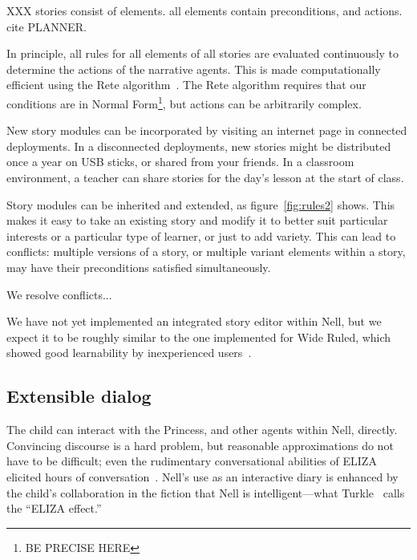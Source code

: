 \documentclass{acm_proc_article-sp}
\begin{document}
XXX stories consist of elements.  all elements contain preconditions,
and actions.  cite PLANNER.

In principle, all rules for all elements of all stories are evaluated
continuously to determine the actions of the narrative agents.  This
is made computationally efficient using the Rete
algorithm~\cite{rete}.  The Rete algorithm requires that our
conditions are in Normal Form\footnote{BE PRECISE HERE}, but actions
can be arbitrarily complex.

New story modules can be incorporated by visiting an internet page in
connected deployments.  In a disconnected deployments, new stories
might be distributed once a year on USB sticks, or shared from your
friends.  In a classroom environment, a teacher can share stories for
the day's lesson at the start of class.

Story modules can be inherited and extended, as figure~\ref{fig:rules2}
shows.  This makes it easy to take an existing story and modify it to
better suit particular interests or a particular type of learner, or
just to add variety.  This can lead to conflicts: multiple versions of
a story, or multiple variant elements within a story, may have their
preconditions satisfied simultaneously.

We resolve conflicts...

We have not yet implemented an integrated story editor within Nell,
but we expect it to be roughly similar to the one implemented for
Wide Ruled, which showed good learnability by inexperienced
users~\cite{wideruled}.


\subsection{Extensible dialog}
The child can interact with the Princess, and other agents within
Nell, directly.  Convincing discourse is a hard problem, but
reasonable approximations do not have to be difficult; even
the rudimentary conversational abilities of ELIZA elicited hours of
conversation~\cite{weizenbaum:power}.
Nell's use as an interactive diary is enhanced by the child's
collaboration in the fiction that Nell is intelligent---what
Turkle~\cite{turkle:alone} calls the ``ELIZA effect.''
\end{document}
